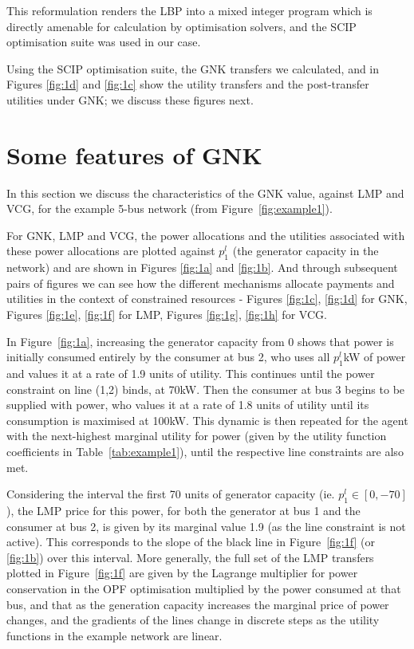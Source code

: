 This reformulation renders the LBP into a mixed integer program which is directly amenable for calculation by optimisation solvers, and the SCIP optimisation suite was used in our case.

Using the SCIP optimisation suite, the GNK transfers we calculated, and in Figures \ref{fig:1d} and \ref{fig:1c} show the utility transfers and the post-transfer utilities under GNK; we discuss these figures next.


\section{Some features of GNK}\label{sec:features}

In this section we discuss the characteristics of the GNK value, against LMP and VCG, for the example 5-bus network (from Figure~\ref{fig:example1}).

For GNK, LMP and VCG, the power allocations and the utilities associated with these power allocations are plotted against $p_1^l$ (the generator capacity in the network) and are shown in Figures \ref{fig:1a} and \ref{fig:1b}.
And through subsequent pairs of figures we can see how the different mechanisms allocate payments and utilities in the context of constrained resources - Figures \ref{fig:1c}, \ref{fig:1d} for GNK, Figures \ref{fig:1e}, \ref{fig:1f} for LMP, Figures \ref{fig:1g}, \ref{fig:1h} for VCG.

\iffigures
% 

\fi

In Figure~\ref{fig:1a}, increasing the generator capacity from $0$ shows that power is initially consumed entirely by the consumer at bus 2, 
who uses all $p_1^l$kW of power and values it at a rate of 1.9 units of utility. This continues until the power constraint on line (1,2) binds, at 70kW.
Then the consumer at bus 3 begins to be supplied with power, who values it at a rate of 1.8 units of utility until its consumption is maximised at 100kW. 
This dynamic is then repeated for the agent with the next-highest marginal utility for power (given by the utility function coefficients in Table~\ref{tab:example1}), until the respective line constraints are also met.

Considering the interval the first 70 units of generator capacity (ie. $p_1^l \in [0,-70]$), the LMP price for this power, for both the generator at bus 1 and the consumer at bus 2, is given by its marginal value 1.9 (as the line constraint is not active). This corresponds to the slope of the black line in Figure~\ref{fig:1f} (or \ref{fig:1b}) over this interval. 
More generally, the full set of the LMP transfers plotted in Figure~\ref{fig:1f} are given by the Lagrange multiplier for power conservation in the OPF optimisation multiplied by the power consumed at that bus, and that as the generation capacity increases the marginal price of power changes, and the gradients of the lines change in discrete steps as the utility functions in the example network are linear.

